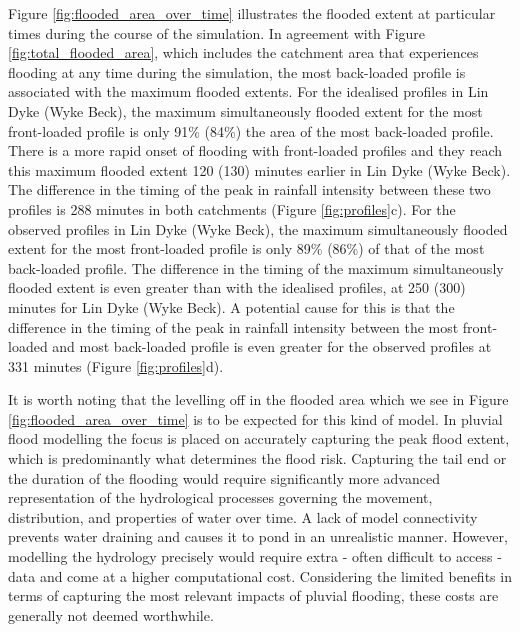 \documentclass[APA,Times2COL]{WileyNJDv5}
\begin{document}
Figure \ref{fig:flooded_area_over_time} illustrates the flooded extent at particular times during the course of the simulation. In agreement with Figure \ref{fig:total_flooded_area}, which includes the catchment area that experiences flooding at any time during the simulation, the most back-loaded profile is associated with the maximum flooded extents. For the idealised profiles in Lin Dyke (Wyke Beck), the maximum simultaneously flooded extent for the most front-loaded profile is only 91\% (84\%) the area of the most back-loaded profile. There is a more rapid onset of flooding with front-loaded profiles and they reach this maximum flooded extent 120 (130) minutes earlier in Lin Dyke (Wyke Beck). The difference in the timing of the peak in rainfall intensity between these two profiles is 288 minutes in both catchments (Figure \ref{fig:profiles}c). For the observed profiles in Lin Dyke (Wyke Beck), the maximum simultaneously flooded extent for the most front-loaded profile is only 89\% (86\%) of that of the most back-loaded profile. The difference in the timing of the maximum simultaneously flooded extent is even greater than with the idealised profiles, at 250 (300) minutes for Lin Dyke (Wyke Beck). A potential cause for this is that the difference in the timing of the peak in rainfall intensity between the most front-loaded and most back-loaded profile is even greater for the observed profiles at 331 minutes (Figure \ref{fig:profiles}d). 

It is worth noting that the levelling off in the flooded area which we see in Figure \ref{fig:flooded_area_over_time} is to be expected for this kind of model. In pluvial flood modelling the focus is placed on accurately capturing the peak flood extent, which is predominantly what determines the flood risk. Capturing the tail end or the duration of the flooding would require significantly more advanced representation of the hydrological processes governing the movement, distribution, and properties of water over time. A lack of model connectivity prevents water draining and causes it to pond in an unrealistic manner. However, modelling the hydrology precisely would require extra - often difficult to access - data and come at a higher computational cost. Considering the limited benefits in terms of capturing the most relevant impacts of pluvial flooding, these costs are generally not deemed worthwhile.
\end{document}
